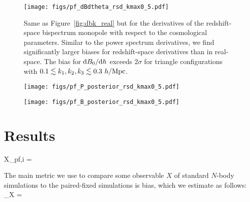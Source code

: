 \begin{figure}
\begin{center}
    \texttt{[image: figs/pf\_dBdtheta\_rsd\_kmax0\_5.pdf]}
    \caption{Same as Figure~\ref{fig:dbk_real} but for the derivatives of the
    redshift-space bispectrum monopole with respect to the cosmological parameters. 
    Similar to the power spectrum derivatives, we find significantly larger biases
    for redshift-space derivatives than in real-space. The bias for 
    ${\rm d} B_0/{\rm d}h$ exceeds $2\sigma$ for triangle configurations with 
    $0.1 \lesssim k_1, k_2, k_3 \lesssim 0.3~h/{\rm Mpc}$.  
    }
\label{fig:dbk_rsd}
\end{center}
\end{figure}

\begin{figure}
\begin{center}
    \texttt{[image: figs/pf\_P\_posterior\_rsd\_kmax0\_5.pdf]}
    \caption{}
\label{fig:ppost_rsd}
\end{center}
\end{figure}

\begin{figure}
\begin{center}
    \texttt{[image: figs/pf\_B\_posterior\_rsd\_kmax0\_5.pdf]}
    \caption{}
\label{fig:bpost_rsd}
\end{center}
\end{figure}

\section{Results} \label{sec:results} 
\beq
X_{{\rm pf},i} =  \big[ X_{{\rm pf},i}^{(1)} + X_{{\rm pf},i}^{(2)}\big]
\eeq

The main metric we use to compare some observable $X$ of standard $N$-body simulations 
to the paired-fixed simulations is bias, which we estimate as follows: 
\beq
\beta_X = 
\eeq
